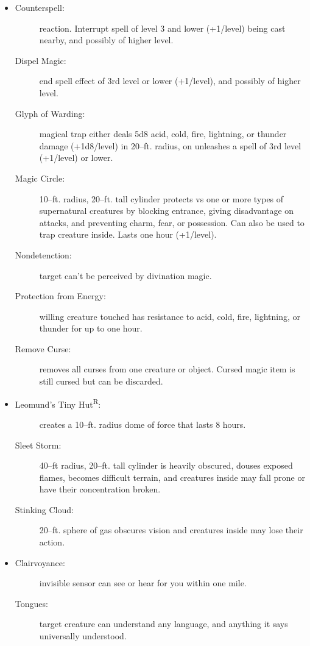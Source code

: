 \documentclass[DIV=14, paper=a4, fontsize=10pt, twocolumn, twoside]{scrartcl}
\begin{document}
\begin{itemize}[align=parleft,labelwidth=1cm]
	\renewcommand{\labelitemi}{Abjur}\item
	\begin{description}
 \item[Counterspell:] reaction. Interrupt spell of level 3 and lower (+1/level) being cast nearby, and possibly of higher level.
 \item[Dispel Magic:] end spell effect of 3rd level or lower (+1/level), and possibly of higher level.
 \item[Glyph of Warding:] magical trap either deals 5d8 acid, cold, fire, lightning, or thunder damage (+1d8/level) in 20–ft. radius, on unleashes a spell of 3rd level (+1/level) or lower.
 \item[Magic Circle:] 10–ft. radius, 20–ft. tall cylinder protects vs one or more types of supernatural creatures by blocking entrance, giving disadvantage on attacks, and preventing charm, fear, or possession. Can also be used to trap creature inside. Lasts one hour (+1/level).
 \item[Nondetenction:] target can’t be perceived by divination magic.
 \item[Protection from Energy:] willing creature touched has resistance to acid, cold, fire, lightning, or thunder for up to one hour.
 \item[Remove Curse:] removes all curses from one creature or object. Cursed magic item is still cursed but can be discarded.
\end{description}
\renewcommand{\labelitemi}{Conj}\item
\begin{description}
 \item[Leomund’s Tiny Hut\textsuperscript{R}:] creates a 10–ft. radius dome of force that lasts 8 hours.
 \item[Sleet Storm:] 40–ft radius, 20–ft. tall cylinder is heavily obscured, douses exposed flames, becomes difficult terrain, and creatures inside may fall prone or have their concentration broken.
 \item[Stinking Cloud:] 20–ft. sphere of gas obscures vision and creatures inside may lose their action.
\end{description}
\renewcommand{\labelitemi}{Div}\item
\begin{description}
 \item[Clairvoyance:] invisible sensor can see or hear for you within one mile.
 \item[Tongues:] target creature can understand any language, and anything it says universally understood.

\end{description}
\end{itemize}
\end{document}
